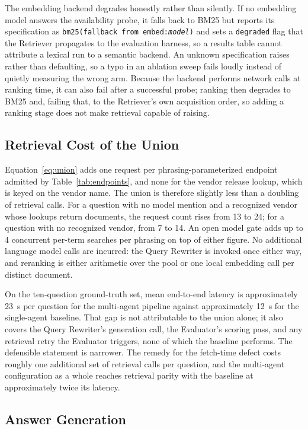 \documentclass[acmsmall,review,anonymous,screen]{acmart}
\begin{document}
The embedding backend degrades honestly rather than silently. If no
embedding model answers the availability probe, it falls back to BM25
but reports its specification as \texttt{bm25(fallback from
embed:\textit{model})} and sets a \texttt{degraded} flag that the
Retriever propagates to the evaluation harness, so a results table
cannot attribute a lexical run to a semantic backend. An unknown
specification raises rather than defaulting, so a typo in an ablation
sweep fails loudly instead of quietly measuring the wrong arm. Because
the backend performs network calls at ranking time, it can also fail
after a successful probe; ranking then degrades to BM25 and, failing
that, to the Retriever's own acquisition order, so adding a ranking
stage does not make retrieval capable of raising.

\subsection{Retrieval Cost of the Union}\label{sec:retrieval-cost}

Equation~\eqref{eq:union} adds one request per phrasing-parameterized
endpoint admitted by Table~\ref{tab:endpoints}, and none for the vendor
release lookup, which is keyed on the vendor name. The union is
therefore slightly less than a doubling of retrieval calls. For a
question with no model mention and a recognized vendor whose lookups
return documents, the request count rises from 13 to 24; for a question
with no recognized vendor, from 7 to 14. An open model gate adds up to
4 concurrent per-term searches per phrasing on top of either figure. No
additional language model calls are incurred: the Query Rewriter is
invoked once either way, and reranking is either arithmetic over the
pool or one local embedding call per distinct document.

On the ten-question ground-truth set, mean end-to-end latency is
approximately 23~s per question for the multi-agent pipeline against
approximately 12~s for the single-agent baseline. That gap is not
attributable to the union alone; it also covers the Query Rewriter's
generation call, the Evaluator's scoring pass, and any retrieval retry
the Evaluator triggers, none of which the baseline performs. The
defensible statement is narrower. The remedy for the fetch-time defect
costs roughly one additional set of retrieval calls per question, and
the multi-agent configuration as a whole reaches retrieval parity with
the baseline at approximately twice its latency.

\subsection{Answer Generation}
\end{document}
